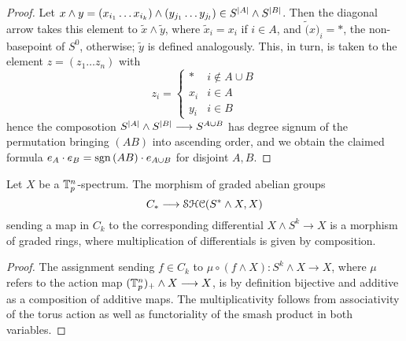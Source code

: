 \begin{lem}
\begin{proof}
Let $x \wedge y = (x_{i_1} \ldots x_{i_k}) \wedge (y_{j_1} \ldots y_{j_l}) \in S^{\left\vert A\right\vert} \wedge S^{\left\vert B\right\vert}$. Then the diagonal arrow takes this element to $ \tilde{x} \wedge \tilde{y}$, where $\tilde{x}_i = x_i$ if $i \in A$, and $\tilde(x)_i = \ast$, the non-basepoint of $S^0$, otherwise; $\tilde{y}$ is defined analogously. This, in turn, is taken to the element $z = (z_1 \ldots z_n)$ with
\[ z_i = \left\{
		\begin{array}{ll}
			\ast & i \nin A \cup B \\
			x_i & i \in A \\
			y_i & i \in B
		\end{array}
	\right.\]
hence the composotion $S^{\left\vert A\right\vert} \wedge S^{\left\vert B\right\vert} \longrightarrow S^{A \cup B}$ has degree signum of the permutation bringing $(AB)$ into ascending order, and we obtain the claimed formula $e_A \cdot e_B = \operatorname{sgn}{(AB)} \cdot e_{A \cup B}$ for disjoint $A,B$.
\end{proof}
\end{lem}
%
%
\begin{cor}\label{cor_diffs_ext_alg}
Let $X$ be a $\mathbb{T}_p^n$-spectrum. The morphism of graded abelian groups%
  \[C_* \longrightarrow \mathcal{SHC}(S^* \wedge X, X)\]%
sending a map in $C_k$ to the corresponding differential $X \wedge S^k \to X$ is a morphism of graded rings, where multiplication of differentials is given by composition.
\begin{proof}
The assignment sending $f \in C_k$ to $\mu \circ (f \wedge X):S^k \wedge X \to X$, where $\mu$ refers to the action map $(\mathbb{T}_p^n)_+ \wedge X \longrightarrow X$, is by definition bijective and additive as a composition of additive maps. The multiplicativity follows from associativity of the torus action as well as functoriality of the smash product in both variables.
\end{proof}
\end{cor}
%
%
